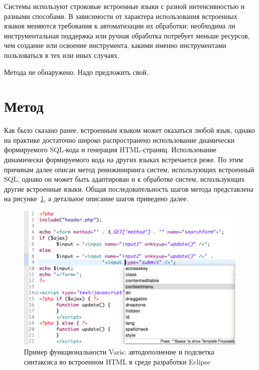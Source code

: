 Системы используют строковые встроенные языки с разной интенсивностью и разными способами. В зависимости от характера использования встроенных языков меняются требования к автоматизации их обработки: необходима ли инструментальная поддержка или ручная обработка потребует меньше ресурсов, чем создание или освоение инструмента, какими именно инструментами пользоваться в тех или иных случаях.

Метода не обнаружено. Надо предложить свой.


\section{Метод}

Как было сказано ранее, встроенным языком может оказаться любой язык, однако на практике достаточно широко распространено использование днамически формируемого SQL-кода и генерация HTML-страниц. Использование динамически формируемого кода на других языках встречается реже. По этим причинам далее описан метод реинжиниринга систем, использующих встроенный SQL, однако он может быть адаптирован и к обработке систем, использующих другие встроенные языки. Общая последовательность шагов метода представлена на рисунке~\ref{fig:method}, а детальное описание шагов приведено далее.

\begin{figure}[h!]
\begin{center}
\includegraphics[width=.9\textwidth]{pics/Varis.pdf}
\caption{Пример функциональности Varis: автодополнение и подсветка синтаксиса во встроенном HTML в среде разработки Eclipse}
\label{fig:method} 
\end{center}
\end{figure}


